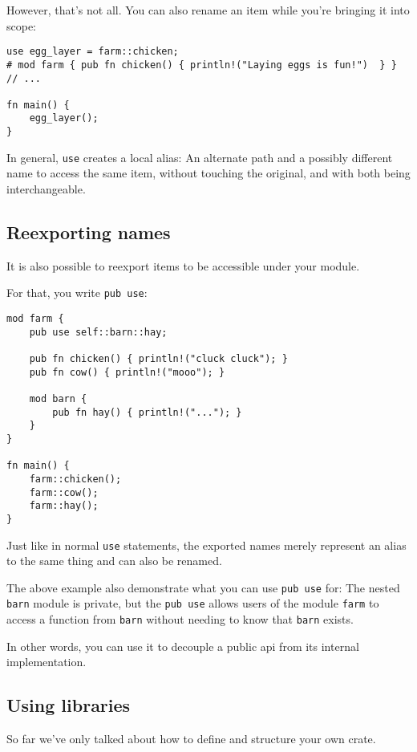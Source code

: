 \documentclass[]{article}
\begin{document}
However, that's not all. You can also rename an item while you're
bringing it into scope:

\begin{verbatim}
use egg_layer = farm::chicken;
# mod farm { pub fn chicken() { println!("Laying eggs is fun!")  } }
// ...

fn main() {
    egg_layer();
}
\end{verbatim}

In general, \texttt{use} creates a local alias: An alternate path and a
possibly different name to access the same item, without touching the
original, and with both being interchangeable.

\subsection{Reexporting names}\label{reexporting-names}

It is also possible to reexport items to be accessible under your
module.

For that, you write \texttt{pub use}:

\begin{verbatim}
mod farm {
    pub use self::barn::hay;

    pub fn chicken() { println!("cluck cluck"); }
    pub fn cow() { println!("mooo"); }

    mod barn {
        pub fn hay() { println!("..."); }
    }
}

fn main() {
    farm::chicken();
    farm::cow();
    farm::hay();
}
\end{verbatim}

Just like in normal \texttt{use} statements, the exported names merely
represent an alias to the same thing and can also be renamed.

The above example also demonstrate what you can use \texttt{pub use}
for: The nested \texttt{barn} module is private, but the
\texttt{pub use} allows users of the module \texttt{farm} to access a
function from \texttt{barn} without needing to know that \texttt{barn}
exists.

In other words, you can use it to decouple a public api from its
internal implementation.

\subsection{Using libraries}\label{using-libraries}

So far we've only talked about how to define and structure your own
crate.
\end{document}
